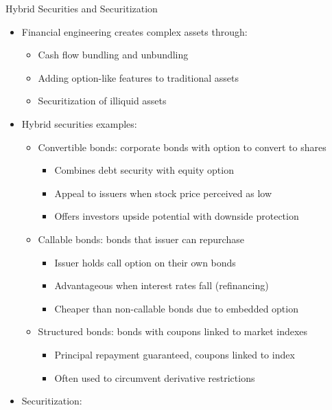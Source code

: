 \documentclass[10pt,handout]{beamer}
\begin{document}
\begin{frame}{Hybrid Securities and Securitization}
  \begin{itemize}[<+->]
    \item Financial engineering creates complex assets through:
      \begin{itemize}
        \item Cash flow bundling and unbundling
        \item Adding option-like features to traditional assets
        \item Securitization of illiquid assets
      \end{itemize}
    \item Hybrid securities examples:
      \begin{itemize}
        \item Convertible bonds: corporate bonds with option to convert to shares
          \begin{itemize}
            \item Combines debt security with equity option
            \item Appeal to issuers when stock price perceived as low
            \item Offers investors upside potential with downside protection
          \end{itemize}
        \item Callable bonds: bonds that issuer can repurchase
          \begin{itemize}
            \item Issuer holds call option on their own bonds
            \item Advantageous when interest rates fall (refinancing)
            \item Cheaper than non-callable bonds due to embedded option
          \end{itemize}
        \item Structured bonds: bonds with coupons linked to market indexes
          \begin{itemize}
            \item Principal repayment guaranteed, coupons linked to index
            \item Often used to circumvent derivative restrictions
          \end{itemize}
      \end{itemize}
    \item Securitization:

\end{itemize}
\end{frame}
\end{document}

